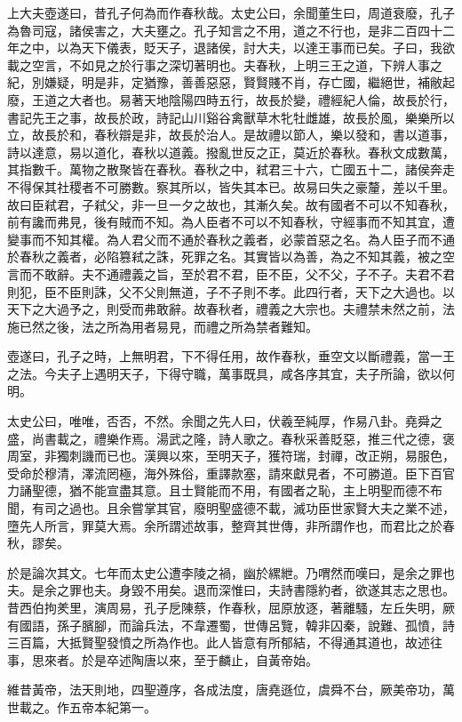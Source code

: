 上大夫壺遂曰，昔孔子何為而作春秋哉。太史公曰，余聞董生曰，周道衰廢，孔子為魯司寇，諸侯害之，大夫壅之。孔子知言之不用，道之不行也，是非二百四十二年之中，以為天下儀表，貶天子，退諸侯，討大夫，以達王事而已矣。子曰，我欲載之空言，不如見之於行事之深切著明也。夫春秋，上明三王之道，下辨人事之紀，別嫌疑，明是非，定猶豫，善善惡惡，賢賢賤不肖，存亡國，繼絕世，補敝起廢，王道之大者也。易著天地陰陽四時五行，故長於變，禮經紀人倫，故長於行，書記先王之事，故長於政，詩記山川谿谷禽獸草木牝牡雌雄，故長於風，樂樂所以立，故長於和，春秋辯是非，故長於治人。是故禮以節人，樂以發和，書以道事，詩以達意，易以道化，春秋以道義。撥亂世反之正，莫近於春秋。春秋文成數萬，其指數千。萬物之散聚皆在春秋。春秋之中，弒君三十六，亡國五十二，諸侯奔走不得保其社稷者不可勝數。察其所以，皆失其本已。故易曰失之豪釐，差以千里。故曰臣弒君，子弒父，非一旦一夕之故也，其漸久矣。故有國者不可以不知春秋，前有讒而弗見，後有賊而不知。為人臣者不可以不知春秋，守經事而不知其宜，遭變事而不知其權。為人君父而不通於春秋之義者，必蒙首惡之名。為人臣子而不通於春秋之義者，必陷篡弒之誅，死罪之名。其實皆以為善，為之不知其義，被之空言而不敢辭。夫不通禮義之旨，至於君不君，臣不臣，父不父，子不子。夫君不君則犯，臣不臣則誅，父不父則無道，子不子則不孝。此四行者，天下之大過也。以天下之大過予之，則受而弗敢辭。故春秋者，禮義之大宗也。夫禮禁未然之前，法施已然之後，法之所為用者易見，而禮之所為禁者難知。

壺遂曰，孔子之時，上無明君，下不得任用，故作春秋，垂空文以斷禮義，當一王之法。今夫子上遇明天子，下得守職，萬事既具，咸各序其宜，夫子所論，欲以何明。

太史公曰，唯唯，否否，不然。余聞之先人曰，伏羲至純厚，作易八卦。堯舜之盛，尚書載之，禮樂作焉。湯武之隆，詩人歌之。春秋采善貶惡，推三代之德，褒周室，非獨刺譏而已也。漢興以來，至明天子，獲符瑞，封禪，改正朔，易服色，受命於穆清，澤流罔極，海外殊俗，重譯款塞，請來獻見者，不可勝道。臣下百官力誦聖德，猶不能宣盡其意。且士賢能而不用，有國者之恥，主上明聖而德不布聞，有司之過也。且余嘗掌其官，廢明聖盛德不載，滅功臣世家賢大夫之業不述，墮先人所言，罪莫大焉。余所謂述故事，整齊其世傳，非所謂作也，而君比之於春秋，謬矣。

於是論次其文。七年而太史公遭李陵之禍，幽於縲紲。乃喟然而嘆曰，是余之罪也夫。是余之罪也夫。身毀不用矣。退而深惟曰，夫詩書隱約者，欲遂其志之思也。昔西伯拘羑里，演周易，孔子戹陳蔡，作春秋，屈原放逐，著離騷，左丘失明，厥有國語，孫子臏腳，而論兵法，不韋遷蜀，世傳呂覽，韓非囚秦，說難、孤憤，詩三百篇，大抵賢聖發憤之所為作也。此人皆意有所郁結，不得通其道也，故述往事，思來者。於是卒述陶唐以來，至于麟止，自黃帝始。

維昔黃帝，法天則地，四聖遵序，各成法度，唐堯遜位，虞舜不台，厥美帝功，萬世載之。作五帝本紀第一。

